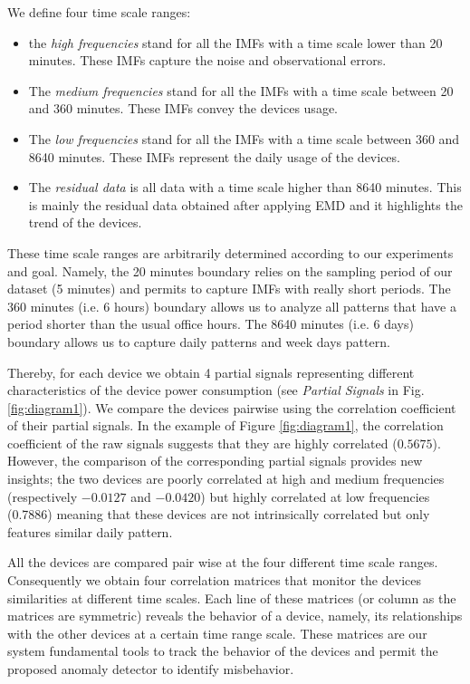 We define four time scale ranges: 
\begin{itemize}
 \item the \emph{high frequencies} stand for all the IMFs with a time scale lower than 20 minutes. These IMFs capture the noise and observational errors.
 \item The \emph{medium frequencies} stand for all the IMFs with a time scale between 20 and 360 minutes. These IMFs convey the devices usage.
 \item The \emph{low frequencies} stand for all the IMFs with a time scale between 360 and 8640 minutes. These IMFs represent the daily usage of the devices.
 \item The \emph{residual data} is all data with a time scale higher than 8640 minutes. This is mainly the residual data obtained after applying EMD and it highlights the trend of the devices.
\end{itemize}

These time scale ranges are arbitrarily determined according to our experiments and goal.
Namely, the 20 minutes boundary relies on the sampling period of our dataset (5 minutes) and permits to capture IMFs with really short periods.
The 360 minutes (i.e. 6 hours) boundary allows us to analyze all patterns that have a period shorter than the usual office hours.
The 8640 minutes (i.e. 6 days) boundary allows us to capture daily patterns and week days pattern.

Thereby, for each device we obtain 4 partial signals representing different characteristics of the device power consumption (see \emph{Partial Signals} in Fig.\ref{fig:diagram1}).
We compare the devices pairwise using the correlation coefficient of their partial signals.
In the example of Figure \ref{fig:diagram1}, the correlation coefficient of the raw signals suggests that they are highly correlated ($0.5675$). 
However, the comparison of the corresponding partial signals provides new insights;
the two devices are poorly correlated at high and medium frequencies (respectively $-0.0127$ and $-0.0420$) but highly correlated at low frequencies (0.7886) meaning that these devices are not intrinsically correlated but only features similar daily pattern.

All the devices are compared pair wise at the four different time scale ranges.
Consequently we obtain four correlation matrices that monitor the devices similarities at different time scales.
Each line of these matrices (or column as the matrices are symmetric) reveals the behavior of a device, namely, its relationships with the other devices at a certain time range scale.
These matrices are our system fundamental tools to track the behavior of the devices and permit the proposed anomaly detector to identify misbehavior.


